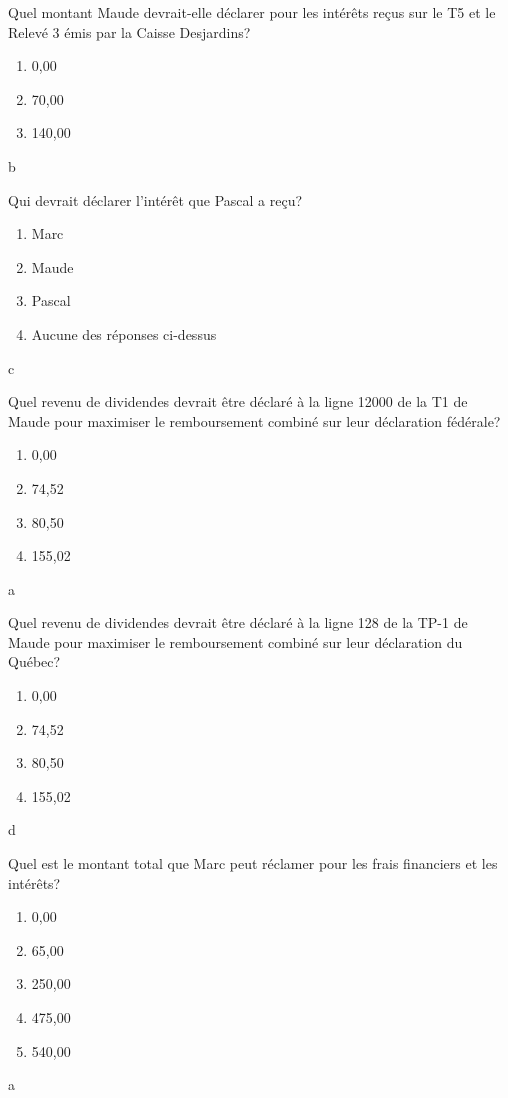 \begin{question}
	Quel montant Maude devrait-elle déclarer pour les intérêts reçus sur le T5 et le Relevé 3 émis par la Caisse Desjardins?
	\begin{enumerate}[label=\alph*)]
		\item 0,00
		\item 70,00
		\item 140,00
	\end{enumerate}
\end{question}
b


\begin{question}
	Qui devrait déclarer l’intérêt que Pascal a reçu?
	\begin{enumerate}[label=\alph*)]
		\item Marc
		\item Maude
		\item Pascal
		\item Aucune des réponses ci-dessus
	\end{enumerate}
\end{question}
c

\begin{question}
	Quel revenu de dividendes devrait être déclaré à la ligne 12000 de la T1 de Maude pour maximiser le remboursement combiné sur leur déclaration fédérale?
	\begin{enumerate}[label=\alph*)]
		\item 0,00
		\item 74,52
		\item 80,50
		\item 155,02
	\end{enumerate}
\end{question}
a

\begin{question}
	Quel revenu de dividendes devrait être déclaré à la ligne 128 de la TP-1 de Maude pour maximiser le remboursement combiné sur leur déclaration du Québec?
	\begin{enumerate}[label=\alph*)]
		\item 0,00
		\item 74,52
		\item 80,50
		\item 155,02
	\end{enumerate}
\end{question}
d

\begin{question}
	Quel est le montant total que Marc peut réclamer pour les frais financiers et les intérêts?
	\begin{enumerate}[label=\alph*)]
		\item 0,00
		\item 65,00
		\item 250,00
		\item 475,00
		\item 540,00
	\end{enumerate}
\end{question}
a

